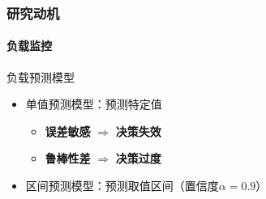 \begin{frame}
\frametitle{研究动机}
\framesubtitle{负载监控}
\begin{block}{负载预测模型}
\begin{itemize}
    \item<1-1> 单值预测模型：预测特定值
    \begin{itemize}
        \item<1-1> \textbf{误差敏感} $\Rightarrow$ \textbf{决策失效}
        \item<1-1> \textbf{鲁棒性差} $\Rightarrow$ \textbf{决策过度}
    \end{itemize}
    \item<2-2> 区间预测模型：预测取值区间（置信度$\alpha=0.9$）
\end{itemize}
\end{block}


\end{frame}
